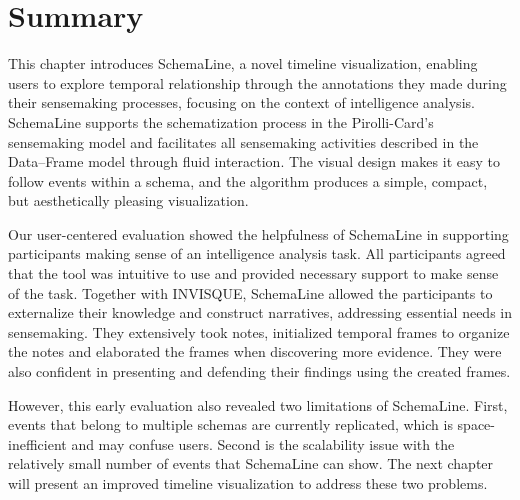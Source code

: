 \section{Summary}
This chapter introduces SchemaLine, a novel timeline visualization, enabling users to explore temporal relationship through the annotations they made during their sensemaking processes, focusing on the context of intelligence analysis. SchemaLine supports the schematization process in the Pirolli-Card's sensemaking model and facilitates all sensemaking activities described in the Data--Frame model through fluid interaction. The visual design makes it easy to follow events within a schema, and the algorithm produces a simple, compact, but aesthetically pleasing visualization. 

Our user-centered evaluation showed the helpfulness of SchemaLine in supporting participants making sense of an intelligence analysis task. All participants agreed that the tool was intuitive to use and provided necessary support to make sense of the task. Together with INVISQUE, SchemaLine allowed the participants to externalize their knowledge and construct narratives, addressing essential needs in sensemaking. They extensively took notes, initialized temporal frames to organize the notes and elaborated the frames when discovering more evidence. They were also confident in presenting and defending their findings using the created frames.

However, this early evaluation also revealed two limitations of SchemaLine. First, events that belong to multiple schemas are currently replicated, which is space-inefficient and may confuse users. Second is the scalability issue with the relatively small number of events that SchemaLine can show. The next chapter will present an improved timeline visualization to address these two problems.
